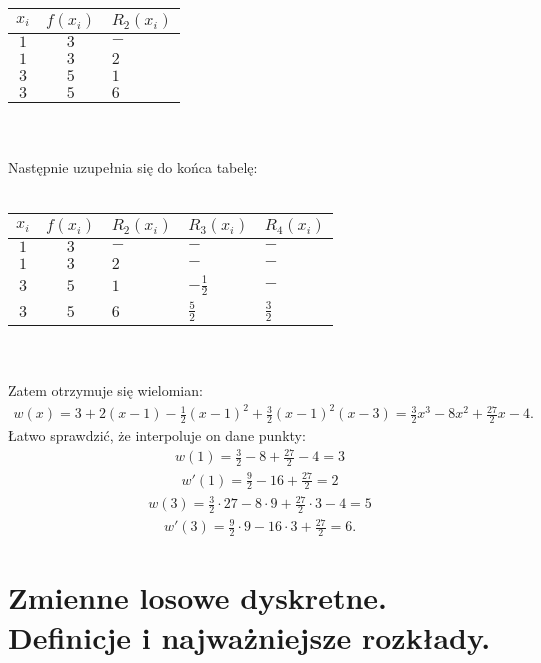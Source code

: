 \documentclass[main.tex]{subfiles}
\begin{document}
    \begin{tabular}{|c|c|l|}
        \hline
        $x_i$ & $f(x_i)$ & $R_2(x_i)$ \\ \hline
        $1$ & $3$ & $-$ \\ \hline
        $1$ & $3$ & $2$ \\ \hline
        $3$ & $5$ & $1$ \\ \hline
        $3$ & $5$ & $6$ \\ \hline
    \end{tabular}\\\\
    Następnie uzupełnia się do końca tabelę:\\\\
    \begin{tabular}{|c|c|l|l|l|}
        \hline
        $x_i$ & $f(x_i)$ & $R_2(x_i)$ & $R_3(x_i)$ & $R_4(x_i)$ \\ \hline
        $1$ & $3$ & $-$ & $-$ & $-$ \\ \hline
        $1$ & $3$ & $2$ & $-$ & $-$ \\ \hline
        $3$ & $5$ & $1$ & $-\frac{1}{2}$ & $-$ \\ \hline
        $3$ & $5$ & $6$ & $\frac{5}{2}$ & $\frac{3}{2}$ \\ \hline
    \end{tabular}\\\\
    Zatem otrzymuje się wielomian:
    \begin{align*}
        w(x)=3+2(x-1)-{\frac {1}{2}}(x-1)^{2}+{\frac {3}{2}}(x-1)^{2}(x-3)={\frac {3}{2}}x^{3}-8x^{2}+{\frac {27}{2}}x-4.
    \end{align*}
    Łatwo sprawdzić, że interpoluje on dane punkty:
    \begin{align*}
        w(1)=\frac{3}{2}-8+\frac{27}{2}-4=3
    \end{align*}
    \begin{align*}
        w'(1)={\frac {9}{2}}-16+{\frac {27}{2}}=2
    \end{align*}
    \begin{align*}
        w(3)={\frac {3}{2}}\cdot 27-8\cdot 9+{\frac {27}{2}}\cdot 3-4=5
    \end{align*}
    \begin{align*}
        w'(3)={\frac {9}{2}}\cdot 9-16\cdot 3+{\frac {27}{2}}=6.
    \end{align*}


    \newpage

    \section{Zmienne losowe dyskretne. Definicje i najważniejsze rozkłady.}
\end{document}
